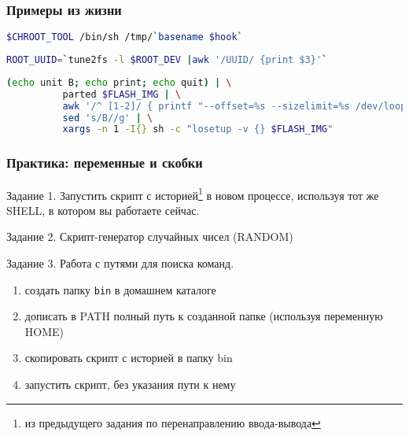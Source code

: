 \begin{frame}[fragile]
  \frametitle{Примеры из жизни}
  \begin{lstlisting}[language=sh,frame=single,basicstyle=\normalsize,breaklines=true]
    $CHROOT_TOOL /bin/sh /tmp/`basename $hook`
  \end{lstlisting} \pause

  \begin{lstlisting}[language=sh,frame=single,basicstyle=\normalsize,breaklines=true]
    ROOT_UUID=`tune2fs -l $ROOT_DEV |awk '/UUID/ {print $3}'`
  \end{lstlisting} \pause
  
  \begin{lstlisting}[language=sh,frame=single,basicstyle=\small,breaklines=true]
    (echo unit B; echo print; echo quit) | \
          parted $FLASH_IMG | \
          awk '/^ [1-2]/ { printf "--offset=%s --sizelimit=%s /dev/loop%s\n", $2, $4, $1 }' | \
          sed 's/B//g' | \
          xargs -n 1 -I{} sh -c "losetup -v {} $FLASH_IMG"
  \end{lstlisting}
\end{frame}

\begin{frame}[fragile]
  \frametitle{Практика: переменные и скобки}
  
  \normalsize{ }
  \alert{Задание 1.}
  Запустить скрипт с историей\footnote{из предыдущего задания по перенаправлению ввода-вывода} в новом процессе, используя тот же SHELL, в котором вы работаете сейчас.  \pause

  \alert{Задание 2.}
  Скрипт-генератор случайных чисел (RANDOM) \pause

  \alert{Задание 3.} Работа с путями для поиска команд.
    \begin{enumerate}
      \item создать папку \verb+bin+ в домашнем каталоге
      \item дописать в PATH полный путь к созданной папке (используя переменную HOME)
      \item скопировать скрипт с историей в папку bin
      \item запустить скрипт, без указания пути к нему 
    \end{enumerate}

\end{frame}

